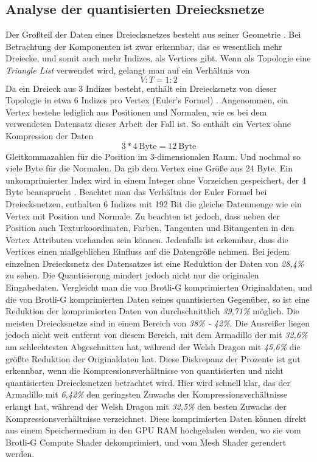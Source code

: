 \subsection{Analyse der quantisierten Dreiecksnetze}
\label{subsec:ana_quantized}
Der Großteil der Daten eines Dreiecksnetzes besteht aus seiner Geometrie \cite{Jakob2017}.
Bei Betrachtung der Komponenten ist zwar erkennbar, das es wesentlich mehr Dreiecke, und somit auch mehr Indizes, als Vertices gibt.
Wenn als Topologie eine \textit{Triangle List} verwendet wird, gelangt man auf ein Verhältnis von 
\begin{equation*}
V:T = 1:2
\end{equation*}
Da ein Dreieck aus 3 Indizes besteht, enthält ein Dreiecksnetz von dieser Topologie in etwa 6 Indizes pro Vertex (Euler's Formel) \cite{Engstad2011}.
Angenommen, ein Vertex bestehe lediglich aus Positionen und Normalen, wie es bei dem verwendeten Datensatz dieser Arbeit der Fall ist.
So enthält ein Vertex ohne Kompression der Daten
\begin{equation*}
3 * 4 \ \text{Byte} = 12 \ \text{Byte}
\end{equation*}
Gleitkommazahlen für die Position im 3-dimensionalen Raum.
Und nochmal so viele Byte für die Normalen.
Da gib dem Vertex eine Größe aus 24 Byte.
Ein unkomprimierter Index wird in einem Integer ohne Vorzeichen gespeichert, der 4 Byte beansprucht \cite{Microsoft2021a}. \newline
Beachtet man das Verhältnis der Euler Formel bei Dreiecksnetzen, enthalten 6 Indizes mit 192 Bit die gleiche Datenmenge wie ein Vertex mit Position und Normale.
Zu beachten ist jedoch, dass neben der Position auch Texturkoordinaten, Farben, Tangenten und Bitangenten in den Vertex Attributen vorhanden sein können. \newline
Jedenfalls ist erkennbar, dass die Vertices einen maßgeblichen Einfluss auf die Datengröße nehmen.
Bei jedem einzelnen Dreiecksnetz des Datensatzes ist eine Reduktion der Daten von \textit{28,4\%} zu sehen.
Die Quantisierung mindert jedoch nicht nur die originalen Eingabedaten.
Vergleicht man die von Brotli-G komprimierten Originaldaten, und die von Brotli-G komprimierten Daten seines quantisierten Gegenüber, so ist eine Reduktion der komprimierten Daten von durchschnittlich \textit{39,71\%} möglich.
Die meisten Dreiecksnetze sind in einem Bereich von \textit{38\% - 42\%}.
Die Ausreißer liegen jedoch nicht weit entfernt von diesem Bereich, mit dem Armadillo der mit \textit{32,6\%} am schlechtesten Abgeschnitten hat, während der Welsh Dragon mit \textit{45,6\%} die größte Reduktion der Originaldaten hat.
Diese Diskrepanz der Prozente ist gut erkennbar, wenn die Kompressionsverhältnisse von quantisierten und nicht quantisierten Dreiecksnetzen betrachtet wird.
Hier wird schnell klar, das der Armadillo mit \textit{6,42\%} den geringsten Zuwachs der Kompressionsverhältnisse erlangt hat, während der Welsh Dragon mit \textit{32,5\%} den besten Zuwachs der Kompressionsverhältnisse verzeichnet.
Diese komprimierten Daten können direkt aus einem Speichermedium in den GPU RAM hochgeladen werden, wo sie vom Brotli-G Compute Shader dekomprimiert, und vom Mesh Shader gerendert werden. \newline

